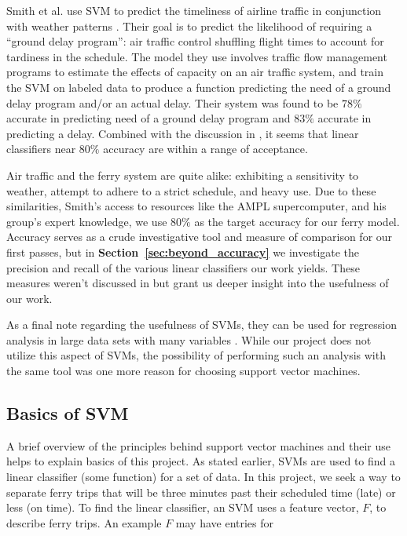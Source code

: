 \documentclass[11pt]{article} %
\begin{document}
Smith et al. use SVM to predict the timeliness of airline
traffic in conjunction with weather patterns \cite{smith2008decision}. Their goal 
is to predict the likelihood of requiring a ``ground delay program'': air traffic
control shuffling flight times
to account for tardiness in the schedule. The model they use involves traffic 
flow management programs to estimate the effects of capacity on an air traffic 
system, and train the SVM on labeled data to produce a function predicting 
the need of a ground delay program and/or an actual delay. Their system was
found to be $78\%$ accurate in predicting need of a ground delay program and $83\%$ 
accurate in predicting a delay. Combined with the discussion in 
\cite{byvatov2003comparison}, it seems that linear classifiers near $80\%$ 
accuracy are within a range of acceptance.

Air traffic and the ferry system are quite alike: exhibiting a
sensitivity to weather, attempt to adhere to a strict schedule, and heavy use.
Due to these similarities, Smith's access to resources like the AMPL supercomputer, 
and his group's expert knowledge, we use $80\%$ as the target accuracy for our
ferry model. Accuracy serves as a crude investigative tool and measure of 
comparison for our first passes, but in \textbf{Section~\ref{sec:beyond_accuracy}}
we investigate the precision and recall of the various linear classifiers our
work yields. These measures weren't discussed in \cite{smith2008decision} but
grant us deeper insight into the usefulness of our work. 

As a final note regarding the usefulness of SVMs, they can be used for regression 
analysis in large
data sets with many variables \cite{chang2011libsvm}. While our project does not
utilize this aspect of SVMs, the possibility of performing such an analysis with the
same tool was one more reason for choosing support vector machines.


\subsection{Basics of SVM}
\label{sec:basics_svm}
A brief overview of the principles behind support vector machines and their use
helps to explain basics of this project. As stated earlier,
SVMs are used to find a linear classifier (some function) for a set of data.  In
this project, we seek a way to separate ferry trips that will be three minutes
past their scheduled time (late) or less (on time). To find the linear classifier,
an SVM uses a feature vector, $F$, to describe ferry trips.  An example $F$ may have
entries for
\end{document}
